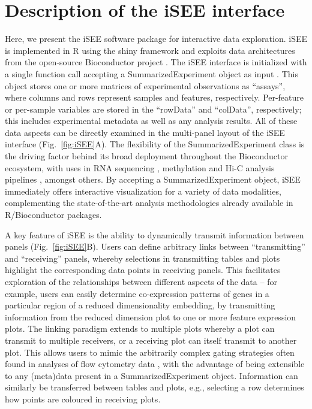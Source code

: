 \documentclass{bioinfo}
\begin{document}
\section{Description of the iSEE interface}
Here, we present the iSEE software package for interactive data exploration.
iSEE is implemented in R using the shiny framework \citep{chang2017shiny} and exploits data architectures from the open-source Bioconductor project \citep{gentleman2004bioconductor}.
The iSEE interface is initialized with a single function call accepting a SummarizedExperiment object as input \citep{huber2015orchestrating}.
This object stores one or more matrices of experimental observations as ``assays'', where columns and rows represent samples and features, respectively.
Per-feature or per-sample variables are stored in the ``rowData'' and ``colData'', respectively; this includes experimental metadata as well as any analysis results.
All of these data aspects can be directly examined in the multi-panel layout of the iSEE interface (Fig.~\ref{fig:iSEE}A).
The flexibility of the SummarizedExperiment class is the driving factor behind its broad deployment throughout the Bioconductor ecosystem, with uses in RNA sequencing \citep{love2014moderated}, methylation \citep{aryee2014minfi} and Hi-C analysis pipelines \citep{lun2016infrastructure}, amongst others.
By accepting a SummarizedExperiment object, iSEE immediately offers interactive visualization for a variety of data modalities, complementing the state-of-the-art analysis methodologies already available in R/Bioconductor packages.

A key feature of iSEE is the ability to dynamically transmit information between panels (Fig.~\ref{fig:iSEE}B).
Users can define arbitrary links between ``transmitting'' and ``receiving'' panels, whereby selections in transmitting tables and plots highlight the corresponding data points in receiving panels.
This facilitates exploration of the relationships between different aspects of the data -- for example, users can easily determine co-expression patterns of genes in a particular region of a reduced dimensionality embedding, by transmitting information from the reduced dimension plot to one or more feature expression plots.
The linking paradigm extends to multiple plots whereby a plot can transmit to multiple receivers, or a receiving plot can itself transmit to another plot.
This allows users to mimic the arbitrarily complex gating strategies often found in analyses of flow cytometry data \citep{finak2014opencyto}, with the advantage of being extensible to any (meta)data present in a SummarizedExperiment object.
Information can similarly be transferred between tables and plots, e.g., selecting a row determines how points are coloured in receiving plots.
\end{document}

